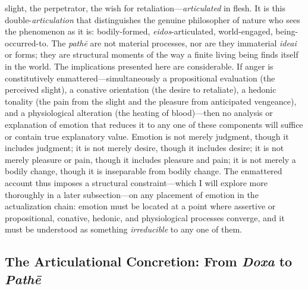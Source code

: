 \documentclass{article}
\begin{document}
slight, the perpetrator, the wish for retaliation---\textit{articulated} in flesh. It is this double-\textit{articulation} that distinguishes the genuine philosopher of nature who sees the phenomenon as it is: bodily-formed, \textit{eidos}-articulated, world-engaged, being-occurred-to. The \textit{pathē} are not material processes, nor are they immaterial \textit{ideai} or forms; they are structural moments of the way a finite living being finds itself in the world. The implications presented here are considerable. If anger is constitutively enmattered---simultaneously a propositional evaluation (the perceived slight), a conative orientation (the desire to retaliate), a hedonic tonality (the pain from the slight and the pleasure from anticipated vengeance), and a physiological alteration (the heating of blood)---then no analysis or explanation of emotion that reduces it to any one of these components will suffice or contain true explanatory value. Emotion is not merely judgment, though it includes judgment; it is not merely desire, though it includes desire; it is not merely pleasure or pain, though it includes pleasure and pain; it is not merely a bodily change, though it is inseparable from bodily change. The enmattered account thus imposes a structural constraint---which I will explore more thoroughly in a later subsection---on any placement of emotion in the actualization chain: emotion must be located at a point where assertive or propositional, conative, hedonic, and physiological processes converge, and it must be understood as something \textit{irreducible} to any one of them.

\subsection{The Articulational Concretion: From \textit{Doxa} to \textit{Pathē}}
\end{document}
